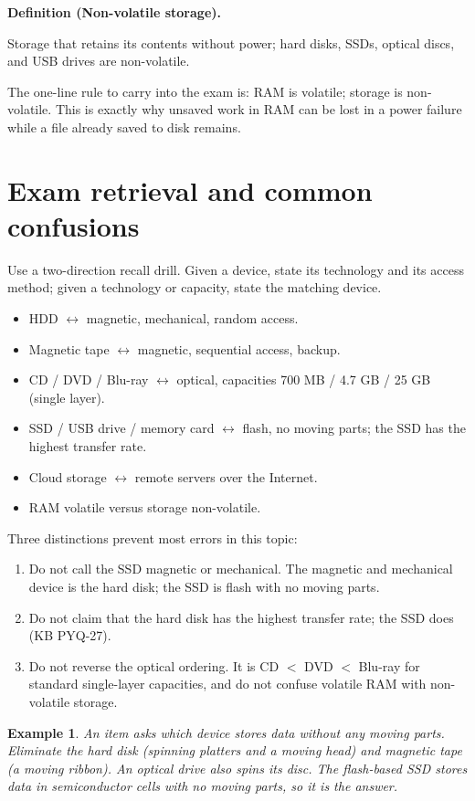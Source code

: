\documentclass[11pt]{article}
\newtheorem{example}{Example}[section]
\newenvironment{definitionbox}[1]{%
  \par\noindent\textbf{Definition (#1).}\ \itshape
}{\par\vspace{0.3em}}
\begin{document}
\begin{definitionbox}{Non-volatile storage}
Storage that retains its contents without power; hard disks, SSDs, optical
discs, and USB drives are non-volatile.
\end{definitionbox}

The one-line rule to carry into the exam is: RAM is volatile; storage is
non-volatile. This is exactly why unsaved work in RAM can be lost in a power
failure while a file already saved to disk remains.

\section{Exam retrieval and common confusions}
Use a two-direction recall drill. Given a device, state its technology and its
access method; given a technology or capacity, state the matching device.
\begin{itemize}
  \item HDD $\leftrightarrow$ magnetic, mechanical, random access.
  \item Magnetic tape $\leftrightarrow$ magnetic, sequential access, backup.
  \item CD / DVD / Blu-ray $\leftrightarrow$ optical, capacities 700 MB /
    4.7 GB / 25 GB (single layer).
  \item SSD / USB drive / memory card $\leftrightarrow$ flash, no moving
    parts; the SSD has the highest transfer rate.
  \item Cloud storage $\leftrightarrow$ remote servers over the Internet.
  \item RAM volatile versus storage non-volatile.
\end{itemize}

Three distinctions prevent most errors in this topic:
\begin{enumerate}
  \item Do not call the SSD magnetic or mechanical. The magnetic and
    mechanical device is the hard disk; the SSD is flash with no moving parts.
  \item Do not claim that the hard disk has the highest transfer rate; the
    SSD does (KB PYQ-27).
  \item Do not reverse the optical ordering. It is CD $<$ DVD $<$ Blu-ray
    for standard single-layer capacities, and do not confuse volatile RAM
    with non-volatile storage.
\end{enumerate}

\begin{example}
An item asks which device stores data without any moving parts. Eliminate the
hard disk (spinning platters and a moving head) and magnetic tape (a moving
ribbon). An optical drive also spins its disc. The flash-based SSD stores data
in semiconductor cells with no moving parts, so it is the answer.
\end{example}
\end{document}
